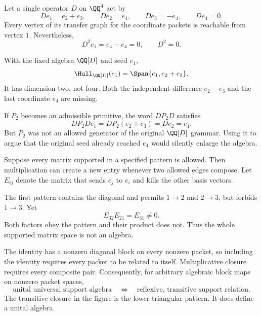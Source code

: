 Let a single operator $D$ on $\QQ^4$ act by
\[
De_1=e_2+e_3,\qquad De_2=e_4,\qquad De_3=-e_4,\qquad De_4=0.
\]
Every vertex of its transfer graph for the coordinate packets is reachable from vertex $1$. Nevertheless,
\[
D^2e_1=e_4-e_4=0,\qquad D^2=0.
\]


With the fixed algebra $\QQ[D]$ and seed $e_1$,
\[
\Hull_{\QQ[D]}(e_1)=\Span\{e_1,e_2+e_3\}.
\]
It has dimension two, not four. Both the independent difference $e_2-e_3$ and the last coordinate $e_4$ are missing.

If $P_2$ becomes an admissible primitive, the word $DP_2D$ satisfies
\[
DP_2De_1=DP_2(e_2+e_3)=De_2=e_4.
\]
But $P_2$ was not an allowed generator of the original $\QQ[D]$ grammar. Using it to argue that the original seed already reached $e_4$ would silently enlarge the algebra.


Suppose every matrix supported in a specified pattern is allowed. Then multiplication can create a new entry whenever two allowed edges compose. Let $E_{ij}$ denote the matrix that sends $e_j$ to $e_i$ and kills the other basis vectors.


The first pattern contains the diagonal and permits $1\to2$ and $2\to3$, but forbids $1\to3$. Yet
\[
E_{32}E_{21}=E_{31}\ne0.
\]
Both factors obey the pattern and their product does not. Thus the whole supported matrix space is not an algebra.

The identity has a nonzero diagonal block on every nonzero packet, so including the identity requires every packet to be related to itself. Multiplicative closure requires every composite pair. Consequently, for arbitrary algebraic block maps on nonzero packet spaces,
\[
\boxed{\text{unital universal support algebra}
\quad\Longleftrightarrow\quad
\text{reflexive, transitive support relation}.}
\]
The transitive closure in the figure is the lower triangular pattern. It does define a unital algebra.

